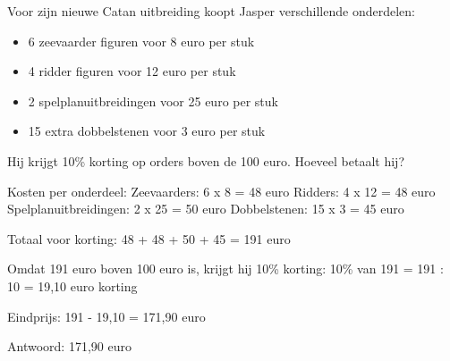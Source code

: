 \begin{opgave}
Voor zijn nieuwe Catan uitbreiding koopt Jasper verschillende onderdelen:
\begin{itemize}
\item 6 zeevaarder figuren voor 8 euro per stuk
\item 4 ridder figuren voor 12 euro per stuk
\item 2 spelplanuitbreidingen voor 25 euro per stuk
\item 15 extra dobbelstenen voor 3 euro per stuk
\end{itemize}
Hij krijgt 10\% korting op orders boven de 100 euro. Hoeveel betaalt hij?
\end{opgave}

\begin{oplossing}
Kosten per onderdeel:
Zeevaarders: 6 x 8 = 48 euro
Ridders: 4 x 12 = 48 euro
Spelplanuitbreidingen: 2 x 25 = 50 euro
Dobbelstenen: 15 x 3 = 45 euro

Totaal voor korting:
48 + 48 + 50 + 45 = 191 euro

Omdat 191 euro boven 100 euro is, krijgt hij 10\% korting:
10\% van 191 = 191 : 10 = 19,10 euro korting

Eindprijs:
191 - 19,10 = 171,90 euro

Antwoord: 171,90 euro
\end{oplossing}